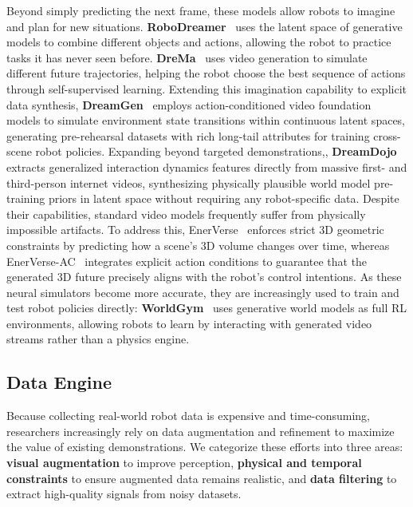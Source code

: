 \documentclass[acmsmall,screen,review,anonymous]{acmart}
\begin{document}
Beyond simply predicting the next frame, these models allow robots to imagine and plan for new situations. 
\textbf{RoboDreamer}~\cite{zhou2024robodreamer} uses the latent space of generative models to combine different objects and actions, allowing the robot to practice tasks it has never seen before. 
\textbf{DreMa}~\cite{barcellona2025dream} uses video generation to simulate different future trajectories, helping the robot choose the best sequence of actions through self-supervised learning.
Extending this imagination capability to explicit data synthesis, \textbf{DreamGen}~\cite{jang2025dreamge} employs action-conditioned video foundation models to simulate environment state transitions within continuous latent spaces, generating pre-rehearsal datasets with rich long-tail attributes for training cross-scene robot policies. Expanding beyond targeted demonstrations,, \textbf{DreamDojo}~\cite{gao2026dreamdojo} extracts generalized interaction dynamics features directly from massive first- and third-person internet videos, synthesizing physically plausible world model pre-training priors in latent space without requiring any robot-specific data.
Despite their capabilities, standard video models frequently suffer from physically impossible artifacts. To address this, EnerVerse~\cite{huang2025enerverse} enforces strict 3D geometric constraints by predicting how a scene's 3D volume changes over time, whereas EnerVerse-AC~\cite{jiang2025enerverseac} integrates explicit action conditions to guarantee that the generated 3D future precisely aligns with the robot's control intentions. As these neural simulators become more accurate, they are increasingly used to train and test robot policies directly: \textbf{WorldGym}~\cite{quevedo2025worldgym} uses generative world models as full RL environments, allowing robots to learn by interacting with generated video streams rather than a physics engine.

\subsection{Data Engine}\label{sec:data_augmentation}

Because collecting real-world robot data is expensive and time-consuming, researchers increasingly rely on data augmentation and refinement to maximize the value of existing demonstrations. We categorize these efforts into three areas: \textbf{visual augmentation} to improve perception, \textbf{physical and temporal constraints} to ensure augmented data remains realistic, and \textbf{data filtering} to extract high-quality signals from noisy datasets.
\end{document}
